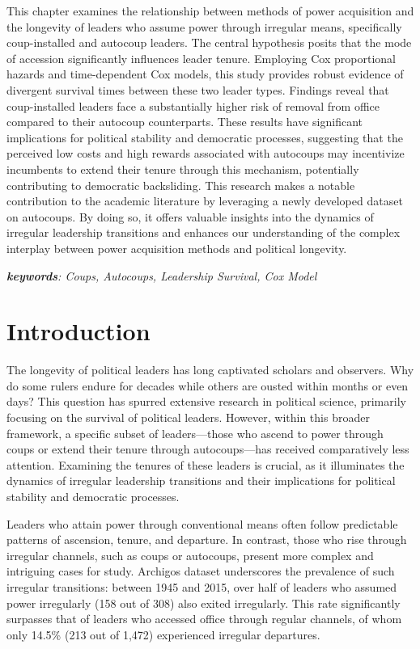 \documentclass[
  12pt,
]{report}
\begin{document}
This chapter examines the relationship between methods of power
acquisition and the longevity of leaders who assume power through
irregular means, specifically coup-installed and autocoup leaders. The
central hypothesis posits that the mode of accession significantly
influences leader tenure. Employing Cox proportional hazards and
time-dependent Cox models, this study provides robust evidence of
divergent survival times between these two leader types. Findings reveal
that coup-installed leaders face a substantially higher risk of removal
from office compared to their autocoup counterparts. These results have
significant implications for political stability and democratic
processes, suggesting that the perceived low costs and high rewards
associated with autocoups may incentivize incumbents to extend their
tenure through this mechanism, potentially contributing to democratic
backsliding. This research makes a notable contribution to the academic
literature by leveraging a newly developed dataset on autocoups. By
doing so, it offers valuable insights into the dynamics of irregular
leadership transitions and enhances our understanding of the complex
interplay between power acquisition methods and political longevity.

\emph{\textbf{keywords}: Coups, Autocoups, Leadership Survival, Cox
Model}

\newpage

\section{Introduction}\label{introduction-3}

The longevity of political leaders has long captivated scholars and
observers. Why do some rulers endure for decades while others are ousted
within months or even days? This question has spurred extensive research
in political science, primarily focusing on the survival of political
leaders. However, within this broader framework, a specific subset of
leaders---those who ascend to power through coups or extend their tenure
through autocoups---has received comparatively less attention. Examining
the tenures of these leaders is crucial, as it illuminates the dynamics
of irregular leadership transitions and their implications for political
stability and democratic processes.

Leaders who attain power through conventional means often follow
predictable patterns of ascension, tenure, and departure. In contrast,
those who rise through irregular channels, such as coups or autocoups,
present more complex and intriguing cases for study. Archigos dataset
underscores the prevalence of such irregular transitions: between 1945
and 2015, over half of leaders who assumed power irregularly (158 out of
308) also exited irregularly. This rate significantly surpasses that of
leaders who accessed office through regular channels, of whom only
14.5\% (213 out of 1,472) experienced irregular departures.
\end{document}
